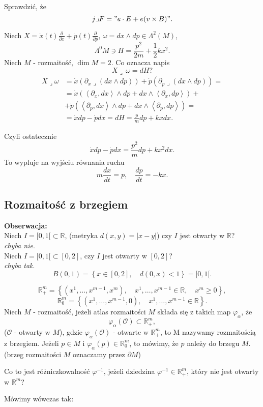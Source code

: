 \documentclass[../main.tex]{subfiles}
\begin{document}
    Sprawdzić, że
    \[
        j \lrcorner F = "e\cdot E + e(v\times B)"
    .\]
\begin{przyklad}
    Niech $X = \dot{x}(t)\frac{\partial }{\partial x} + \dot{p}(t)\frac{\partial }{\partial p} $, $\omega = dx\land dp \in \Lambda^2(M)$,
     \[
         \Lambda^0M \ni H = \frac{p^2}{2m} + \frac{1}{2}kx^2
    .\]
Niech $M$ - rozmaitość, $\dim M = 2$. Co oznacza napis
\[
X\lrcorner\, \omega = dH?
\]
\begin{align*}
    X \lrcorner \omega &= \dot{x}\left(\partial_x \lrcorner (dx\land dp)\right) + \dot{p}\left(\partial_p \lrcorner (dx\land dp)\right) =\\
    &= \dot{x}\left(\left<\partial_x, dx \right>\land dp + dx\land \left<\partial_x, dp \right>\right) +\\
    &+ \dot{p}\left(\left<\partial_p, dx \right>\land dp + dx\land\left<\partial_p, dp \right>\right) = \\
    &= \dot{x}dp - \dot{p}dx = dH = \frac{p}{m}dp + kx dx
.\end{align*}

Czyli ostatecznie
\[
    \dot{x}dp - \dot{p}dx = \frac{p^2}{m}dp + kx^2dx
.\]
To wypluje na wyjściu równania ruchu
\[
m \frac{dx}{dt} = p,\quad \frac{dp}{dt} = -kx
.\]
\end{przyklad}
\subsection{Rozmaitość z brzegiem}
\textbf{Obserwacja:}\\
Niech $I = [0,1[\subset\mathbb{R}$, (metryka $d(x,y) = |x-y|$) czy $I$ jest otwarty w $\mathbb{R}$? \\
\textit{chyba nie}.\\
Niech $I = [0,1[\subset[0,2]$, czy $I$ jest otwarty w $[0,2]$? \\
\textit{chyba tak}.
\[
    B(0,1) = \left\{ x\in [0,2],\quad d(0,x) < 1 \right\} = [0,1[
.\]

\begin{definicja}
    \[
        \mathbb{R}^m_+ = \left\{ (x^1,\ldots,x^{m-1},x^m),\quad x^1,\ldots,x^{m-1}\in\mathbb{R},\quad x^m \ge 0 \right\}
    ,\]
\[
    \mathbb{R}^m_0 = \left\{ (x^1,\ldots,x^{m-1}, 0),\quad x^1,\ldots,x^{m-1}\in\mathbb{R} \right\}
.\]
    Niech $M$ - rozmaitość, jeżeli atlas rozmaitości $M$ składa się z takich map $\varphi_\alpha$, że \[
        \varphi_\alpha(\mathcal{O})\subset\mathbb{R}^m_+
    ,\]
($\mathcal{O}$ - otwarty w $M$), gdzie $\varphi_\alpha(\mathcal{O})$ - otwarte w $\mathbb{R}^m_+$, to M nazywamy rozmaitością z brzegiem. Jeżeli $p\in M$ i $\varphi_\alpha(p)\in \mathbb{R}^m_0$, to mówimy, że $p$ należy do brzegu $M$.\\
    (brzeg rozmaitości $M$ oznaczamy przez $\partial M$)
\end{definicja}
\begin{pytanie}
    Co to jest różniczkowalność $\varphi^{-1}$, jeżeli dziedzina $\varphi^{-1}\in \mathbb{R}^m_+$, który nie jest otwarty w $\mathbb{R}^m$?
\end{pytanie}
Mówimy wówczas tak:
\end{document}
